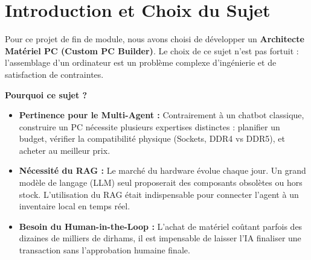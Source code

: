 \documentclass[12pt,a4paper]{article}
\begin{document}
\section{Introduction et Choix du Sujet}
Pour ce projet de fin de module, nous avons choisi de d\'evelopper un \textbf{Architecte Mat\'eriel PC (Custom PC Builder)}. Le choix de ce sujet n'est pas fortuit : l'assemblage d'un ordinateur est un probl\`eme complexe d'ing\'enierie et de satisfaction de contraintes. 

\textbf{Pourquoi ce sujet ?}
\begin{itemize}
    \item \textbf{Pertinence pour le Multi-Agent :} Contrairement \`a un chatbot classique, construire un PC n\'ecessite plusieurs expertises distinctes : planifier un budget, v\'erifier la compatibilit\'e physique (Sockets, DDR4 vs DDR5), et acheter au meilleur prix.
    \item \textbf{N\'ecessit\'e du RAG :} Le march\'e du hardware \'evolue chaque jour. Un grand mod\`ele de langage (LLM) seul proposerait des composants obsol\`etes ou hors stock. L'utilisation du RAG \'etait indispensable pour connecter l'agent \`a un inventaire local en temps r\'eel.
    \item \textbf{Besoin du Human-in-the-Loop :} L'achat de mat\'eriel co\^utant parfois des dizaines de milliers de dirhams, il est impensable de laisser l'IA finaliser une transaction sans l'approbation humaine finale.
\end{itemize}
\end{document}
